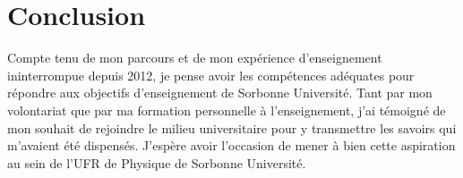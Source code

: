 \documentclass[12pt,onecolumn]{article}
\begin{document}
%

\section*{Conclusion}

\indent \indent Compte tenu de mon parcours et de mon expérience d'enseignement ininterrompue depuis 2012, je pense avoir les comp\'{e}tences adéquates pour répondre aux objectifs d'enseignement de Sorbonne Université. Tant par mon volontariat que par ma formation personnelle à l'enseignement, j'ai témoigné de mon souhait de rejoindre le milieu universitaire pour y transmettre les savoirs qui m'avaient été dispensés. J'espère avoir l'occasion de mener à bien cette aspiration au sein de l'UFR de Physique de Sorbonne Université.



\end{document}

